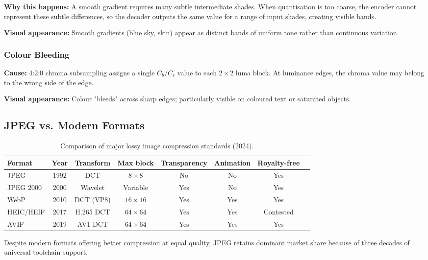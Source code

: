 \textbf{Why this happens:} A smooth gradient requires many subtle intermediate shades. When quantisation is too coarse, the encoder cannot represent these subtle differences, so the decoder outputs the same value for a range of input shades, creating visible bands.

\textbf{Visual appearance:} Smooth gradients (blue sky, skin) appear as distinct bands of uniform tone rather than continuous variation.

\subsubsection{Colour Bleeding}

\textbf{Cause:} 4:2:0 chroma subsampling assigns a single $C_b/C_r$ value to each $2\times2$ luma block. At luminance edges, the chroma value may belong to the wrong side of the edge.

\textbf{Visual appearance:} Colour "bleeds" across sharp edges; particularly visible on coloured text or saturated objects.

\subsection{JPEG vs. Modern Formats}

\begin{table}[H]
\centering
\caption{Comparison of major lossy image compression standards (2024).}
\label{tab:formats}
\begin{tabular}{lccccccc}
\toprule
\textbf{Format} & \textbf{Year} & \textbf{Transform} &
  \textbf{Max block} & \textbf{Transparency} & \textbf{Animation} &
  \textbf{Royalty-free} \\
\midrule
JPEG         & 1992 & DCT    & $8\times8$    & No  & No  & Yes \\
JPEG 2000    & 2000 & Wavelet & Variable    & Yes & No  & Yes \\
WebP         & 2010 & DCT (VP8) & $16\times16$ & Yes & Yes & Yes \\
HEIC/HEIF    & 2017 & H.265 DCT & $64\times64$ & Yes & Yes & Contested \\
AVIF         & 2019 & AV1 DCT & $64\times64$ & Yes & Yes & Yes \\
\bottomrule
\end{tabular}
\end{table}

Despite modern formats offering better compression at equal quality, JPEG retains dominant market share because of three decades of universal toolchain support.

